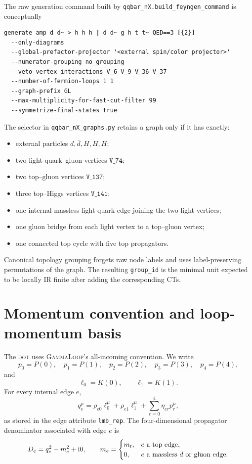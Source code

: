 \documentclass[11pt]{article}
\newcommand{\ii}{\mathrm{i}}
\newcommand{\GammaLoop}{\textsc{GammaLoop}}
\newcommand{\DOT}{\textsc{dot}}
\newcommand{\lzero}{\ell_0}
\newcommand{\lone}{\ell_1}
\newcommand{\MT}{m_t}
\begin{document}
The raw generation command built by \texttt{qqbar\_nX.build\_feyngen\_command}
is conceptually
\begin{lstlisting}
generate amp d d~ > h h h | d d~ g h t t~ QED==3 [{2}]
  --only-diagrams
  --global-prefactor-projector '<external spin/color projector>'
  --numerator-grouping no_grouping
  --veto-vertex-interactions V_6 V_9 V_36 V_37
  --number-of-fermion-loops 1 1
  --graph-prefix GL
  --max-multiplicity-for-fast-cut-filter 99
  --symmetrize-final-states true
\end{lstlisting}
The selector in \texttt{qqbar\_nX\_graphs.py} retains a graph only if it has
exactly:
\begin{itemize}[leftmargin=2em]
  \item external particles \(d,\bar d,H,H,H\);
  \item two light-quark--gluon vertices \(\texttt{V\_74}\);
  \item two top--gluon vertices \(\texttt{V\_137}\);
  \item three top--Higgs vertices \(\texttt{V\_141}\);
  \item one internal massless light-quark edge joining the two light vertices;
  \item one gluon bridge from each light vertex to a top--gluon vertex;
  \item one connected top cycle with five top propagators.
\end{itemize}
Canonical topology grouping forgets raw node labels and uses label-preserving
permutations of the graph.  The resulting \texttt{group\_id} is the minimal
unit expected to be locally IR finite after adding the corresponding CTs.

\section{Momentum convention and loop-momentum basis}

The \DOT{} uses \GammaLoop{}'s all-incoming convention.  We write
\[
  p_0=P(0),\quad p_1=P(1),\quad p_2=P(2),\quad
  p_3=P(3),\quad p_4=P(4),
\]
and
\[
  \lzero=K(0),\qquad \lone=K(1).
\]
For every internal edge \(e\),
\[
  q_e^\mu
  =
  \rho_{e0}\ell_0^\mu+\rho_{e1}\ell_1^\mu
  +\sum_{r=0}^{4}\eta_{er}p_r^\mu ,
\]
as stored in the edge attribute \texttt{lmb\_rep}.  The four-dimensional
propagator denominator associated with edge \(e\) is
\[
  D_e=q_e^2-m_e^2+\ii0,\qquad
  m_e=
  \begin{cases}
    \MT, & e\hbox{ a top edge},\\
    0, & e\hbox{ a massless \(d\) or gluon edge}.
  \end{cases}
\]
\end{document}
